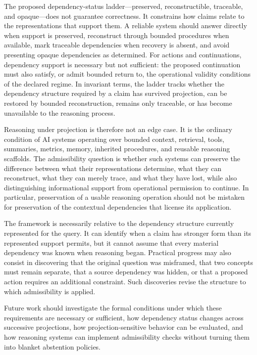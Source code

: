 \documentclass[11pt]{article}
\begin{document}
The proposed dependency-status ladder---preserved, reconstructible, traceable, and opaque---does not guarantee correctness. It constrains how claims relate to the representations that support them. A reliable system should answer directly when support is preserved, reconstruct through bounded procedures when available, mark traceable dependencies when recovery is absent, and avoid presenting opaque dependencies as determined. For actions and continuations, dependency support is necessary but not sufficient: the proposed continuation must also satisfy, or admit bounded return to, the operational validity conditions of the declared regime. In invariant terms, the ladder tracks whether the dependency structure required by a claim has survived projection, can be restored by bounded reconstruction, remains only traceable, or has become unavailable to the reasoning process.

Reasoning under projection is therefore not an edge case. It is the ordinary condition of AI systems operating over bounded context, retrieval, tools, summaries, metrics, memory, inherited procedures, and reusable reasoning scaffolds. The admissibility question is whether such systems can preserve the difference between what their representations determine, what they can reconstruct, what they can merely trace, and what they have lost, while also distinguishing informational support from operational permission to continue. In particular, preservation of a usable reasoning operation should not be mistaken for preservation of the contextual dependencies that license its application.

The framework is necessarily relative to the dependency structure currently represented for the query. It can identify when a claim has stronger form than its represented support permits, but it cannot assume that every material dependency was known when reasoning began. Practical progress may also consist in discovering that the original question was misframed, that two concepts must remain separate, that a source dependency was hidden, or that a proposed action requires an additional constraint. Such discoveries revise the structure to which admissibility is applied.

Future work should investigate the formal conditions under which these requirements are necessary or sufficient, how dependency status changes across successive projections, how projection-sensitive behavior can be evaluated, and how reasoning systems can implement admissibility checks without turning them into blanket abstention policies.
\end{document}
